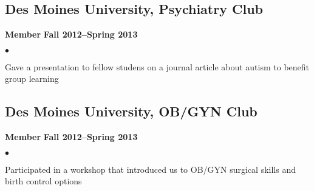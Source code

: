 \documentclass[10pt,letterpaper]{article}
\renewenvironment{itemize}{
  \begin{list}{}{
      \setlength{\leftmargin}{1.5em}
      \setlength{\itemsep}{0.25em}
      \setlength{\parskip}{0pt}
      \setlength{\parsep}{0.25em}
    }
  }{
  \end{list}
}
\newenvironment{bitemize}{
  \begin{list}{$\bullet$}{
      \setlength{\leftmargin}{1.5em}
      \setlength{\itemsep}{0.25em}
      \setlength{\parskip}{0pt}
      \setlength{\parsep}{0.25em}
    }
  }{
  \end{list}
}
\begin{document}
\subsection*{Des Moines University, Psychiatry Club}
\begin{itemize}
\item \textbf{Member} \hfill \textbf{Fall 2012--Spring 2013}
  \begin{bitemize}
  \item Gave a presentation to fellow studens on a journal article about autism to benefit group learning
   \end{bitemize}
\end{itemize}

\subsection*{Des Moines University, OB/GYN Club}
\begin{itemize}
\item \textbf{Member} \hfill \textbf{Fall 2012--Spring 2013}
  \begin{bitemize}
  \item Participated in a workshop that introduced us to OB/GYN surgical
  skills and birth control options
    \end{bitemize}
\end{itemize}
\end{document}
